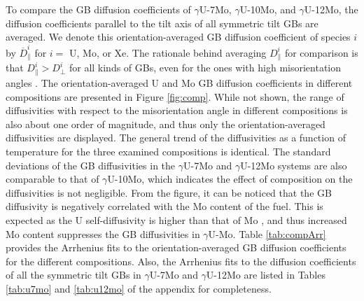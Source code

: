 \documentclass{elsarticle}
\begin{document}
To compare the GB diffusion coefficients of $\gamma$U-7Mo, $\gamma$U-10Mo, and $\gamma$U-12Mo, the diffusion coefficients parallel to the tilt axis of all symmetric tilt GBs are averaged. We denote this orientation-averaged GB diffusion coefficient of species $i$ by $\overline{D}^i_{\parallel}$ for $i=$ U, Mo, or Xe. The rationale behind averaging $D^i_{\parallel}$ for comparison is that $D^i_{\parallel} > D^i_{\perp}$ for all kinds of GBs, even for the ones with high misorientation angles \cite{mishin2015}. The orientation-averaged U and Mo GB diffusion coefficients in different compositions are presented in Figure \ref{fig:comp}. While not shown, the range of diffusivities with respect to the misorientation angle in different compositions is also about one order of magnitude, and thus only the orientation-averaged diffusivities are displayed. The general trend of the diffusivities as a function of temperature for the three examined compositions is identical. The standard deviations of the GB diffusivities in the $\gamma$U-7Mo and $\gamma$U-12Mo systems are also comparable to that of $\gamma$U-10Mo, which indicates the effect of composition on the diffusivities is not negligible. From the figure, it can be noticed that the GB diffusivity is negatively correlated with the Mo content of the fuel. This is expected as the U self-diffusivity is higher than that of Mo \cite{huang2013}, and thus increased Mo content suppresses the GB diffusivities in $\gamma$U-Mo. Table \ref{tab:compArr} provides the Arrhenius fits to the orientation-averaged GB diffusion coefficients for the different compositions. Also, the Arrhenius fits to the diffusion coefficients of all the symmetric tilt GBs in $\gamma$U-7Mo and $\gamma$U-12Mo are listed in Tables \ref{tab:u7mo} and \ref{tab:u12mo} of the appendix for completeness.
\end{document}
